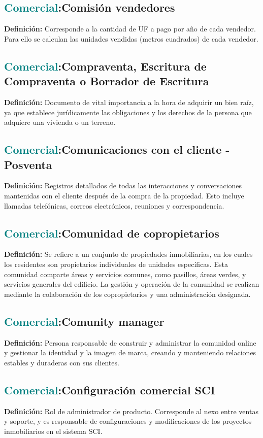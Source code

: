 \documentclass[12pt]{article}
\begin{document}
\subsection{\textcolor{teal}{Comercial}:{Comisión vendedores}}
\textbf{Definición:} Corresponde a la cantidad de UF a pago por año de cada vendedor. Para ello se calculan las unidades vendidas (metros cuadrados) de cada vendedor.
\subsection{\textcolor{teal}{Comercial}:{Compraventa, Escritura de Compraventa o Borrador de Escritura}}
\textbf{Definición:} Documento de vital importancia a la hora de adquirir un bien raíz, ya que establece jurídicamente las obligaciones y los derechos de la persona que adquiere una vivienda o un terreno.
\subsection{\textcolor{teal}{Comercial}:{Comunicaciones con el cliente - Posventa}}
\textbf{Definición:} Registros detallados de todas las interacciones y conversaciones mantenidas con el cliente después de la compra de la propiedad. Esto incluye llamadas telefónicas, correos electrónicos, reuniones y correspondencia.
\subsection{\textcolor{teal}{Comercial}:{Comunidad de copropietarios}}
\textbf{Definición:} Se refiere a un conjunto de propiedades inmobiliarias, en los cuales los residentes son propietarios individuales de unidades específicas. Esta comunidad comparte áreas y servicios comunes, como pasillos, áreas verdes, y servicios generales del edificio. La gestión y operación de la comunidad se realizan mediante la colaboración de los copropietarios y una administración designada.
\subsection{\textcolor{teal}{Comercial}:{Comunity manager}}
\textbf{Definición:}  Persona responsable de construir y administrar la comunidad online y gestionar la identidad y la imagen de marca, creando y manteniendo relaciones estables y duraderas con sus clientes.
\subsection{\textcolor{teal}{Comercial}:{Configuración comercial SCI}}
\textbf{Definición:} Rol de administrador de producto. Corresponde al nexo entre ventas y soporte, y es responsable de configuraciones y modificaciones de los proyectos inmobiliarios en el sistema SCI.
\end{document}
